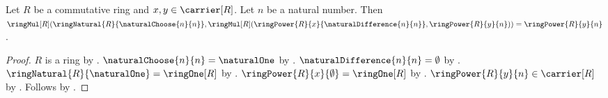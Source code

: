 \begin{lemma}\label{ring_binomial_last_term}
    Let $R$ be a commutative ring and $x,y\in\carrier[R]$.
    Let $n$ be a natural number.
    Then
        $\ringMul[R](
            \ringNatural{R}{\naturalChoose{n}{n}},
            \ringMul[R](
                \ringPower{R}{x}{\naturalDifference{n}{n}},
                \ringPower{R}{y}{n}))
            =\ringPower{R}{y}{n}$.
\end{lemma}
\begin{proof}
    $R$ is a ring by .
    $\naturalChoose{n}{n}=\naturalOne$ by
        .
    $\naturalDifference{n}{n}=\emptyset$ by
        .
    $\ringNatural{R}{\naturalOne}=\ringOne[R]$ by
        .
    $\ringPower{R}{x}{\emptyset}=\ringOne[R]$ by
        .
    $\ringPower{R}{y}{n}\in\carrier[R]$ by
        .
    Follows by
        .
\end{proof}

